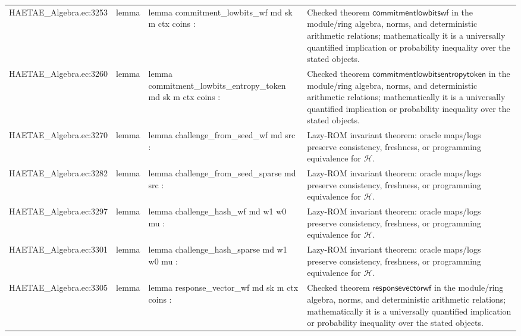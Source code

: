 \documentclass[10pt]{article}
\begin{document}
\begin{longtable}{L{0.11\textwidth}L{0.055\textwidth}L{0.385\textwidth}L{0.41\textwidth}}
HAETAE\_\allowbreak{}Algebra.\allowbreak{}ec:\allowbreak{}3253 & lemma & {\ttfamily\scriptsize lemma commitment\_\allowbreak{}lowbits\_\allowbreak{}wf md sk m ctx coins :} & Checked theorem $\mathsf{commitmentlowbitswf}$ in the module/ring algebra, norms, and deterministic arithmetic relations; mathematically it is a universally quantified implication or probability inequality over the stated objects. \\
HAETAE\_\allowbreak{}Algebra.\allowbreak{}ec:\allowbreak{}3260 & lemma & {\ttfamily\scriptsize lemma commitment\_\allowbreak{}lowbits\_\allowbreak{}entropy\_\allowbreak{}token md sk m ctx coins :} & Checked theorem $\mathsf{commitmentlowbitsentropytoken}$ in the module/ring algebra, norms, and deterministic arithmetic relations; mathematically it is a universally quantified implication or probability inequality over the stated objects. \\
HAETAE\_\allowbreak{}Algebra.\allowbreak{}ec:\allowbreak{}3270 & lemma & {\ttfamily\scriptsize lemma challenge\_\allowbreak{}from\_\allowbreak{}seed\_\allowbreak{}wf md src :} & Lazy-ROM invariant theorem: oracle maps/logs preserve consistency, freshness, or programming equivalence for $\mathcal H$. \\
HAETAE\_\allowbreak{}Algebra.\allowbreak{}ec:\allowbreak{}3282 & lemma & {\ttfamily\scriptsize lemma challenge\_\allowbreak{}from\_\allowbreak{}seed\_\allowbreak{}sparse md src :} & Lazy-ROM invariant theorem: oracle maps/logs preserve consistency, freshness, or programming equivalence for $\mathcal H$. \\
HAETAE\_\allowbreak{}Algebra.\allowbreak{}ec:\allowbreak{}3297 & lemma & {\ttfamily\scriptsize lemma challenge\_\allowbreak{}hash\_\allowbreak{}wf md w1 w0 mu :} & Lazy-ROM invariant theorem: oracle maps/logs preserve consistency, freshness, or programming equivalence for $\mathcal H$. \\
HAETAE\_\allowbreak{}Algebra.\allowbreak{}ec:\allowbreak{}3301 & lemma & {\ttfamily\scriptsize lemma challenge\_\allowbreak{}hash\_\allowbreak{}sparse md w1 w0 mu :} & Lazy-ROM invariant theorem: oracle maps/logs preserve consistency, freshness, or programming equivalence for $\mathcal H$. \\
HAETAE\_\allowbreak{}Algebra.\allowbreak{}ec:\allowbreak{}3305 & lemma & {\ttfamily\scriptsize lemma response\_\allowbreak{}vector\_\allowbreak{}wf md sk m ctx coins :} & Checked theorem $\mathsf{responsevectorwf}$ in the module/ring algebra, norms, and deterministic arithmetic relations; mathematically it is a universally quantified implication or probability inequality over the stated objects. \\

\end{longtable}
\end{document}
